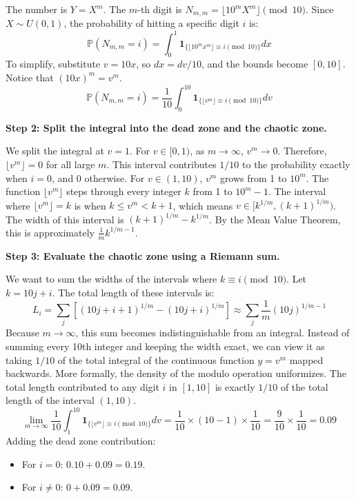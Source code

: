 \begin{solution}
The number is $Y = X^m$. The $m$-th digit is $N_{m,m} = \lfloor 10^m X^m \rfloor \pmod{10}$.
Since $X \sim U(0,1)$, the probability of hitting a specific digit $i$ is:
\[ \mathbb{P}(N_{m,m} = i) = \int_0^1 \mathbf{1}_{\{\lfloor 10^m x^m \rfloor \equiv i \pmod{10}\}} dx \]
To simplify, substitute $v = 10x$, so $dx = dv/10$, and the bounds become $[0, 10]$. Notice that $(10x)^m = v^m$.
\[ \mathbb{P}(N_{m,m} = i) = \frac{1}{10} \int_0^{10} \mathbf{1}_{\{\lfloor v^m \rfloor \equiv i \pmod{10}\}} dv \]

\textbf{Step 2: Split the integral into the dead zone and the chaotic zone.}

We split the integral at $v=1$.
For $v \in [0, 1)$, as $m \to \infty$, $v^m \to 0$. Therefore, $\lfloor v^m \rfloor = 0$ for all large $m$.
This interval contributes $1/10$ to the probability exactly when $i=0$, and $0$ otherwise.
For $v \in (1, 10)$, $v^m$ grows from 1 to $10^m$. The function $\lfloor v^m \rfloor$ steps through every integer $k$ from 1 to $10^m - 1$.
The interval where $\lfloor v^m \rfloor = k$ is when $k \leq v^m < k+1$, which means $v \in [k^{1/m}, (k+1)^{1/m})$.
The width of this interval is $(k+1)^{1/m} - k^{1/m}$. By the Mean Value Theorem, this is approximately $\frac{1}{m} k^{1/m - 1}$.

\textbf{Step 3: Evaluate the chaotic zone using a Riemann sum.}

We want to sum the widths of the intervals where $k \equiv i \pmod{10}$. Let $k = 10j + i$.
The total length of these intervals is:
\[ L_i = \sum_j \left[ (10j + i + 1)^{1/m} - (10j + i)^{1/m} \right] \approx \sum_j \frac{1}{m} (10j)^{1/m - 1} \]
Because $m \to \infty$, this sum becomes indistinguishable from an integral. Instead of summing every 10th integer and keeping the width exact, we can view it as taking $1/10$ of the total integral of the continuous function $y = v^m$ mapped backwards.
More formally, the density of the modulo operation uniformizes. The total length contributed to any digit $i$ in $[1, 10]$ is exactly $1/10$ of the total length of the interval $(1, 10)$.
\[ \lim_{m \to \infty} \frac{1}{10} \int_1^{10} \mathbf{1}_{\{\lfloor v^m \rfloor \equiv i \pmod{10}\}} dv = \frac{1}{10} \times (10 - 1) \times \frac{1}{10} = \frac{9}{10} \times \frac{1}{10} = 0.09 \]
Adding the dead zone contribution:
\begin{itemize}
    \item For $i=0$: $0.10 + 0.09 = 0.19$.
    \item For $i \neq 0$: $0 + 0.09 = 0.09$.
\end{itemize}


\end{solution}
